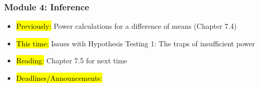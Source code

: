 
\begin{frame}
    \frametitle{Module 4: Inference}
    \begin{itemize}
        \item \hl{Previously: }Power calculations for a difference of means (Chapter 7.4)
        \item \hl{This time: } Issues with Hypothesis Testing 1: The traps of insufficient power
        \item \hl{Reading: }Chapter 7.5 for next time
        \item \hl{Deadlines/Announcements: }
    \end{itemize}
    
\end{frame}